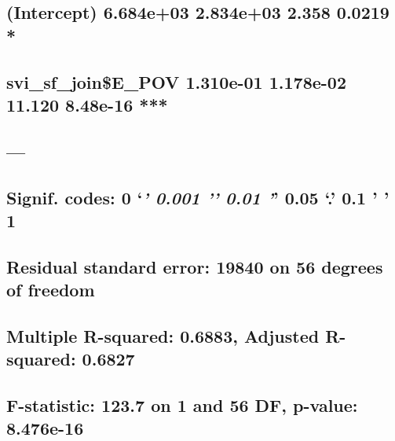 \documentclass[
  12pt,
]{article}
\begin{document}
\hypertarget{intercept-6.684e03-2.834e03-2.358-0.0219}{%
\subsection{(Intercept) 6.684e+03 2.834e+03 2.358 0.0219
*}\label{intercept-6.684e03-2.834e03-2.358-0.0219}}

\hypertarget{svi_sf_joine_pov-1.310e-01-1.178e-02-11.120-8.48e-16}{%
\subsection{svi\_sf\_join\$E\_POV 1.310e-01 1.178e-02 11.120 8.48e-16
***}\label{svi_sf_joine_pov-1.310e-01-1.178e-02-11.120-8.48e-16}}

\hypertarget{section-58}{%
\subsection{---}\label{section-58}}

\hypertarget{signif.-codes-0-0.001-0.01-0.05-.-0.1-1-5}{%
\subsection{\texorpdfstring{Signif. codes: 0 `\emph{\textbf{' 0.001 '}'
0.01 '}' 0.05 `.' 0.1 ' '
1}{Signif. codes: 0 `\,' 0.001 '\,' 0.01 '\,' 0.05 `.' 0.1 ' ' 1}}\label{signif.-codes-0-0.001-0.01-0.05-.-0.1-1-5}}

\hypertarget{section-59}{%
\subsection{}\label{section-59}}

\hypertarget{residual-standard-error-19840-on-56-degrees-of-freedom}{%
\subsection{Residual standard error: 19840 on 56 degrees of
freedom}\label{residual-standard-error-19840-on-56-degrees-of-freedom}}

\hypertarget{multiple-r-squared-0.6883-adjusted-r-squared-0.6827}{%
\subsection{Multiple R-squared: 0.6883, Adjusted R-squared:
0.6827}\label{multiple-r-squared-0.6883-adjusted-r-squared-0.6827}}

\hypertarget{f-statistic-123.7-on-1-and-56-df-p-value-8.476e-16}{%
\subsection{F-statistic: 123.7 on 1 and 56 DF, p-value:
8.476e-16}\label{f-statistic-123.7-on-1-and-56-df-p-value-8.476e-16}}
\end{document}
